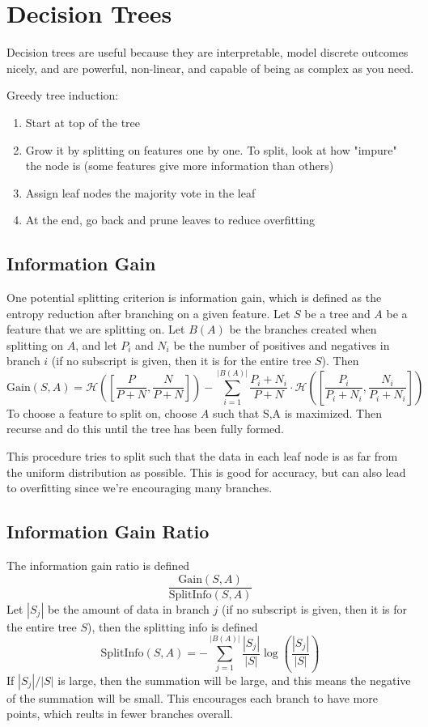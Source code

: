 \documentclass{article}
\begin{document}

\section{Decision Trees}
Decision trees are useful because they are interpretable, model discrete outcomes nicely, and are powerful, non-linear, and capable of being as complex as you need.

Greedy tree induction:
\begin{enumerate}
	\item Start at top of the tree
	\item Grow it by splitting on features one by one. To split, look at how "impure" the node is (some features give more information than others)
	\item Assign leaf nodes the majority vote in the leaf
	\item At the end, go back and prune leaves to reduce overfitting
\end{enumerate}

\subsection{Information Gain}
One potential splitting criterion is information gain, which is defined as the entropy reduction after branching on a given feature. Let $S$ be a tree and $A$ be a feature that we are splitting on. Let $B(A)$ be the branches created when splitting on $A$, and let $P_i$ and $N_i$ be the number of positives and negatives in branch $i$ (if no subscript is given, then it is for the entire tree $S $). Then
\[
	\text{Gain}(S,A) = \mathcal{H}\left( \left[ \frac{P}{P+N}, \frac{N}{P+N} \right] \right) - \sum_{i=1}^{|B(A)|} \frac{P_i+N_i}{P+N} \cdot \mathcal{H}\left( \left[ \frac{P_i}{P_i+N_i}, \frac{N_i}{P_i+N_i}  \right] \right)
\] 
To choose a feature to split on, choose $A$ such that $\text{S,A}$ is maximized. Then recurse and do this until the tree has been fully formed.

This procedure tries to split such that the data in each leaf node is as far from the uniform distribution as possible. This is good for accuracy, but can also lead to overfitting since we're encouraging many branches.

\subsection{Information Gain Ratio}
The information gain ratio is defined
\[
	\frac{\text{Gain}(S,A)}{\text{SplitInfo}(S,A)}
\]
Let $|S_j|$ be the amount of data in branch $j$ (if no subscript is given, then it is for the entire tree $S$), then the splitting info is defined
\[
	\text{SplitInfo}(S,A) = -\sum_{j=1}^{|B(A)|} \frac{|S_j|}{|S|} \log \left( \frac{|S_j|}{|S|} \right)
\] 
If $|S_j|/|S|$ is large, then the summation will be large, and this means the negative of the summation will be small. This encourages each branch to have more points, which reults in fewer branches overall.
\end{document}
